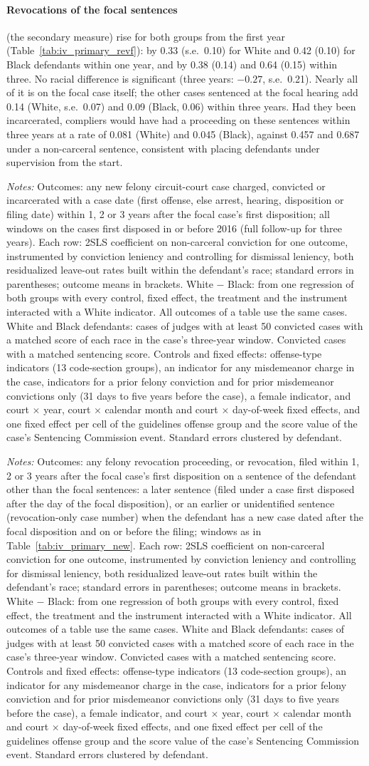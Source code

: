 \documentclass[11pt]{article}
\newcommand{\tabnote}[1]{\par\vspace{0.6ex}\begin{minipage}{\linewidth}\linespread{1}\footnotesize\textit{Notes:} #1\end{minipage}}
\newcommand{\controlsnote}{offense-type indicators (13 code-section groups), an indicator for any misdemeanor charge in the case, indicators for a prior felony conviction and for prior misdemeanor convictions only (31 days to five years before the case), a female indicator, and court $\times$ year, court $\times$ calendar month and court $\times$ day-of-week fixed effects}
\newcommand{\specnoteprim}{Convicted cases with a matched sentencing score. Controls and fixed effects: \controlsnote, and one fixed effect per cell of the guidelines offense group and the score value of the case's Sentencing Commission event. Standard errors clustered by defendant.}
\newcommand{\racesamplenote}{White and Black defendants: cases of judges with at least 50 convicted cases with a matched score of each race in the case's three-year window.}
\newcommand{\ivnote}{Each row: 2SLS coefficient on non-carceral conviction for one outcome, instrumented by conviction leniency and controlling for dismissal leniency, both residualized leave-out rates built within the defendant's race; standard errors in parentheses; outcome means in brackets. White $-$ Black: from one regression of both groups with every control, fixed effect, the treatment and the instrument interacted with a White indicator. All outcomes of a table use the same cases. \racesamplenote}
\begin{document}
\paragraph{Revocations of the focal sentences} (the secondary measure) rise for both groups from the first year (Table~\ref{tab:iv_primary_revf}): by 0.33 (s.e.\ 0.10) for White and 0.42 (0.10) for Black defendants within one year, and by 0.38 (0.14) and 0.64 (0.15) within three. No racial difference is significant (three years: $-0.27$, s.e.\ 0.21). Nearly all of it is on the focal case itself; the other cases sentenced at the focal hearing add 0.14 (White, s.e.\ 0.07) and 0.09 (Black, 0.06) within three years. Had they been incarcerated, compliers would have had a proceeding on these sentences within three years at a rate of 0.081 (White) and 0.045 (Black), against 0.457 and 0.687 under a non-carceral sentence, consistent with placing defendants under supervision from the start.

\begin{table}[H]
\centering
\caption{2SLS from the disposition: non-carceral conviction and new felony cases}\label{tab:iv_primary_new}
{\small\linespread{1}\selectfont\renewcommand{\arraystretch}{0.9}}
\tabnote{Outcomes: any new felony circuit-court case charged, convicted or incarcerated with a case date (first offense, else arrest, hearing, disposition or filing date) within 1, 2 or 3 years after the focal case's first disposition; all windows on the cases first disposed in or before 2016 (full follow-up for three years). \ivnote{} \specnoteprim}
\end{table}

\begin{table}[H]
\centering
\caption{2SLS from the disposition: non-carceral conviction and revocations of other sentences (primary revocation measure)}\label{tab:iv_primary_revo}
{\small\linespread{1}\selectfont\renewcommand{\arraystretch}{0.9}}
\tabnote{Outcomes: any felony revocation proceeding, or revocation, filed within 1, 2 or 3 years after the focal case's first disposition on a sentence of the defendant other than the focal sentences: a later sentence (filed under a case first disposed after the day of the focal disposition), or an earlier or unidentified sentence (revocation-only case number) when the defendant has a new case dated after the focal disposition and on or before the filing; windows as in Table~\ref{tab:iv_primary_new}. \ivnote{} \specnoteprim}
\end{table}
\end{document}
